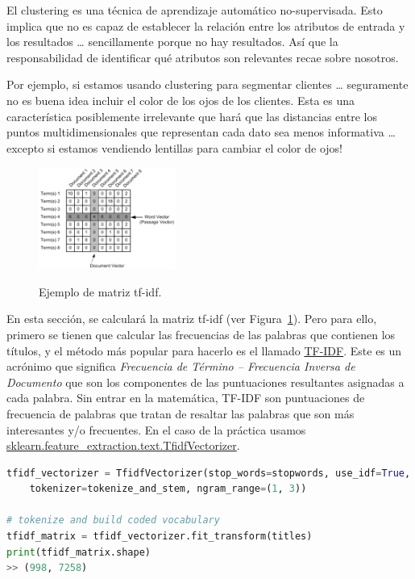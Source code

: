 \documentclass{uimppracticas}
\begin{document}
El clustering es una técnica de aprendizaje automático no-supervisada. Esto implica que no es capaz de establecer la relación entre los atributos de entrada y los resultados … sencillamente porque no hay resultados. Así que la responsabilidad de identificar qué atributos son relevantes recae sobre nosotros.

Por ejemplo, si estamos usando clustering para segmentar clientes … seguramente no es buena idea incluir el color de los ojos de los clientes. Esta es una característica posiblemente irrelevante que hará que las distancias entre los puntos multidimensionales que representan cada dato sea menos informativa … excepto si estamos vendiendo lentillas para cambiar el color de ojos!





\begin{figure}
	\centering
	\caption{Ejemplo de matriz tf-idf.}
	\includegraphics[width=0.4\textwidth]{images/matrix}
	\label{matrix}
\end{figure}

En esta sección, se calculará la matriz tf-idf (ver Figura~\ref{matrix}). Pero para ello, primero se tienen que calcular las frecuencias de las palabras que contienen los títulos, y el método más popular para hacerlo es el llamado \href{https://es.wikipedia.org/wiki/Tf-idf}{TF-IDF}. Este es un acrónimo que significa \textit{Frecuencia de Término – Frecuencia Inversa de Documento} que son los componentes de las puntuaciones resultantes asignadas a cada palabra. Sin entrar en la matemática, TF-IDF son puntuaciones de frecuencia de palabras que tratan de resaltar las palabras que son más interesantes y/o frecuentes. En el caso de la práctica usamos \href{https://scikit-learn.org/stable/modules/generated/sklearn.feature_extraction.text.TfidfVectorizer.html}{sklearn.feature\_extraction.text.TfidfVectorizer}.

\begin{lstlisting}[language=python]
tfidf_vectorizer = TfidfVectorizer(stop_words=stopwords, use_idf=True, 
	tokenizer=tokenize_and_stem, ngram_range=(1, 3))
									
# tokenize and build coded vocabulary
tfidf_matrix = tfidf_vectorizer.fit_transform(titles)
print(tfidf_matrix.shape)
>> (998, 7258)
\end{lstlisting}
\end{document}
